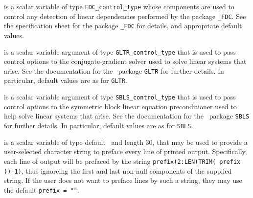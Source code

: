 \begin{description}
 is a scalar variable of type 
{\tt FDC\_control\_type}
whose components are used to control any detection of linear dependencies
performed by the package 
{\tt \libraryname\_FDC}. 
See the specification sheet for the package 
{\tt \libraryname\_FDC} 
for details, and appropriate default values.

 is a scalar variable argument of type 
{\tt GLTR\_control\_type} that is used to pass control
options to the conjugate-gradient solver used to solve linear systems that arise. 
See the documentation for the \galahad\ package {\tt GLTR} for further details. 
In particular, default values are as for {\tt GLTR}.

 is a scalar variable argument of type 
{\tt SBLS\_control\_type} that is used to pass control
options to the symmetric block linear equation preconditioner 
used to help solve linear systems that arise. 
See the documentation for the \galahad\ package {\tt SBLS} for further details. 
In particular, default values are as for {\tt SBLS}.

 is a scalar variable of type default \character\
and length 30, that may be used to provide a user-selected 
character string to preface every line of printed output. 
Specifically, each line of output will be prefaced by the string 
{\tt prefix(2:LEN(TRIM( prefix ))-1)},
thus ignoreing the first and last non-null components of the
supplied string. If the user does not want to preface lines by such
a string, they may use the default {\tt prefix = ""}.

\end{description}
